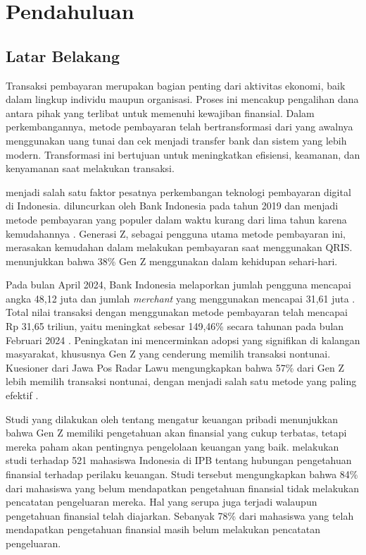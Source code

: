 \chapter{Pendahuluan}
\label{chapter:pendahuluan}

\section{Latar Belakang}
\label{sec:latar-belakang}

Transaksi pembayaran merupakan bagian penting dari aktivitas ekonomi, baik dalam lingkup individu maupun organisasi. Proses ini mencakup pengalihan dana antara pihak yang terlibat untuk memenuhi kewajiban finansial. Dalam perkembangannya, metode pembayaran telah bertransformasi dari yang awalnya menggunakan uang tunai dan cek menjadi transfer bank dan sistem yang lebih modern. Transformasi ini bertujuan untuk meningkatkan efisiensi, keamanan, dan kenyamanan saat melakukan transaksi.

\qrisfull{} menjadi salah satu faktor pesatnya perkembangan teknologi pembayaran digital di Indonesia. \qris{} diluncurkan oleh Bank Indonesia pada tahun 2019 dan menjadi metode pembayaran yang populer dalam waktu kurang dari lima tahun karena kemudahannya \parencite{qris}. Generasi Z, sebagai pengguna utama metode pembayaran ini, merasakan kemudahan dalam melakukan pembayaran saat menggunakan QRIS.  menunjukkan bahwa 38\% Gen Z menggunakan \qris{} dalam kehidupan sehari-hari.


Pada bulan April 2024, Bank Indonesia melaporkan jumlah pengguna \qris{} mencapai angka 48,12 juta dan jumlah \emph{merchant} yang menggunakan mencapai 31,61 juta \parencite{CNNqris2024}. Total nilai transaksi dengan menggunakan metode pembayaran \qris{} telah mencapai Rp 31,65 triliun, yaitu meningkat sebesar 149,46\% secara tahunan pada bulan Februari 2024 \parencite{Tempo2024BIQRIS}. Peningkatan ini mencerminkan adopsi yang signifikan di kalangan masyarakat, khususnya Gen Z yang cenderung memilih transaksi nontunai. Kuesioner dari Jawa Pos Radar Lawu mengungkapkan bahwa 57\% dari Gen Z lebih memilih transaksi nontunai, dengan \qris{} menjadi salah satu metode yang paling efektif \parencite{jawapos2024qris}.

Studi yang dilakukan oleh  tentang mengatur keuangan pribadi menunjukkan bahwa Gen Z memiliki pengetahuan akan finansial yang cukup terbatas, tetapi mereka paham akan pentingnya pengelolaan keuangan yang baik.  melakukan studi terhadap 521 mahasiswa Indonesia di IPB tentang hubungan pengetahuan finansial terhadap perilaku keuangan. Studi tersebut mengungkapkan bahwa 84\% dari mahasiswa yang belum mendapatkan pengetahuan finansial tidak melakukan pencatatan pengeluaran mereka. Hal yang serupa juga terjadi walaupun pengetahuan finansial telah diajarkan. Sebanyak 78\% dari mahasiswa yang telah mendapatkan pengetahuan finansial masih belum melakukan pencatatan pengeluaran. 

